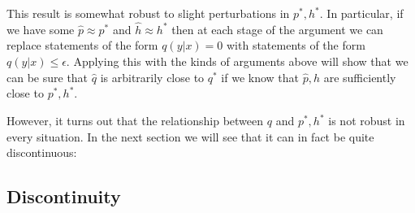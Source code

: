 This result is somewhat robust to slight perturbations in $p^*,h^*$.  In particular, if we have some $\hat p\approx p^*$ and $\hat h\approx h^*$ then at each stage of the argument we can replace statements of the form $q(y|x)=0$ with statements of the form $q(y|x)\leq \epsilon$.  Applying this with the kinds of arguments above will show that we can be sure that $\hat q$ is arbitrarily close to $q^*$ if we know that $\hat p,\hat h$ are sufficiently close to $p^*,h^*$.  

However, it turns out that the relationship between $q$ and $p^*,h^*$ is not robust in every situation.  In the next section we will see that it can in fact be quite discontinuous:

\subsection{Discontinuity}

